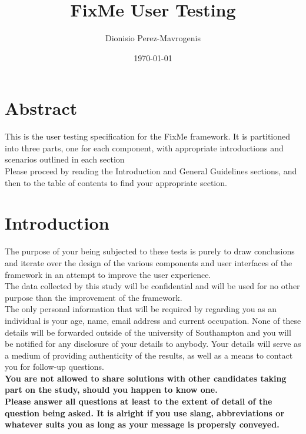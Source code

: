 \documentclass[12pt]{article}
\begin{document}
\author{Dionisio Perez-Mavrogenis}
\date{\today}
\title{FixMe User Testing}
\clearpage
\maketitle
\thispagestyle{empty}
\pagebreak

\section*{Abstract}
This is the user testing specification for the FixMe framework. It is partitioned into three parts, one for each component, with appropriate introductions and scenarios outlined in each section \\

Please proceed by reading the Introduction and General Guidelines sections, and then to the table of contents to find your appropriate section.

\pagebreak
\tableofcontents
\pagebreak

\section{Introduction}
The purpose of your being subjected to these tests is purely to draw conclusions and iterate over the design of the various components and user interfaces of the framework in an attempt to improve the user experience.\\

The data collected by this study will be confidential and will be used for no other purpose than the improvement of the framework. \\

The only personal information that will be required by regarding you as an individual is your age, name, email address and current occupation. None of these details will be forwarded outside of the university of Southampton and you will be notified for any disclosure of your details to anybody. Your details will serve as a medium of providing authenticity of the results, as well as a means to contact you for follow-up questions.\\

\textbf{You are not allowed to share solutions with other candidates taking part on the study, should you happen to know one.}\\

\textbf{Please answer all questions at least to the extent of detail of the question being asked. It is alright if you use slang, abbreviations or whatever suits you as long as your message is propersly conveyed. }\\
\end{document}
